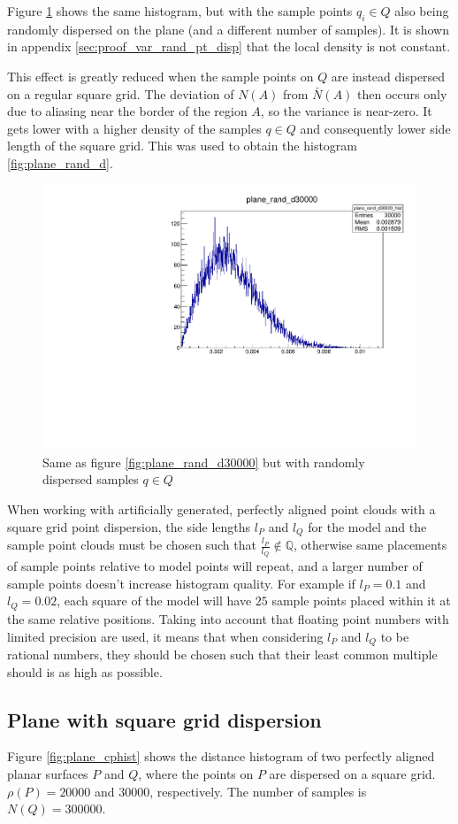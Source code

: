 Figure \ref{fig:plane_rand_d30000_randQ} shows the same histogram, but with the sample points $q_i \in Q$ also being randomly dispersed on the plane (and a different number of samples). It is shown in appendix \ref{sec:proof_var_rand_pt_disp} that the local density is not constant.

This effect is greatly reduced when the sample points on $Q$ are instead dispersed on a regular square grid. The deviation of $N(A)$ from $\bar{N}(A)$ then occurs only due to aliasing near the border of the region $A$, so the variance is near-zero. It gets lower with a higher density of the samples $q \in Q$ and consequently lower side length of the square grid. This was used to obtain the histogram \ref{fig:plane_rand_d}.

\begin{figure}[p]
\centering
\includegraphics[width=.6\textwidth]{fig/plane_rand_d30000.pdf}
\caption{Same as figure \ref{fig:plane_rand_d30000} but with randomly dispersed samples $q \in Q$}
\label{fig:plane_rand_d30000_randQ}
\end{figure}


When working with artificially generated, perfectly aligned point clouds with a square grid point dispersion, the side lengths $l_P$ and $l_Q$ for the model and the sample point clouds must be chosen such that $\frac{l_P}{l_Q} \notin \mathbb{Q}$, otherwise same placements of sample points relative to model points will repeat, and a larger number of sample points doesn't increase histogram quality. For example if $l_P = 0.1$ and $l_Q = 0.02$, each square of the model will have $25$ sample points placed within it at the same relative positions. Taking into account that floating point numbers with limited precision are used, it means that when considering $l_P$ and $l_Q$ to be rational numbers, they should be chosen such that their least common multiple should is as high as possible.


\subsection{Plane with square grid dispersion}
Figure \ref{fig:plane_cphist} shows the distance histogram of two perfectly aligned planar surfaces $P$ and $Q$, where the points on $P$ are dispersed on a square grid. $\rho(P) = 20000$ and $30000$, respectively. The number of samples is $N(Q) = 300000$.

